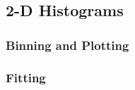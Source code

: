 \subsection{2-D Histograms}
\label{subsec:analysis_subsection}



\subsubsection{Binning and Plotting}
\label{subsubsec:2d_binning_plotting}



\subsubsection{Fitting}
\label{subsubsec:2d_fitting}




